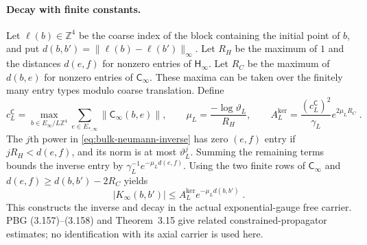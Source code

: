 \documentclass[11pt]{article}
\begin{document}
\paragraph{Decay with finite constants.}
Let $\ell(b)\in\mathbb Z^4$ be the coarse index of the block containing the initial point of $b$, and put $d(b,b')=\|\ell(b)-\ell(b')\|_\infty$. Let $R_H$ be the maximum of $1$ and the distances $d(e,f)$ for nonzero entries of $\mathsf H_\infty$. Let $R_C$ be the maximum of $d(b,e)$ for nonzero entries of $\mathsf C_\infty$. These maxima can be taken over the finitely many entry types modulo coarse translation. Define
\begin{equation}\label{eq:bulk-decay-constants}
    c_L^{\mathsf C}=\max_{b\in E_\infty/L\mathbb Z^4}
        \sum_{e\in E_{*,\infty}}\|\mathsf C_\infty(b,e)\|,
    \qquad
    \mu_L=\frac{-\log\vartheta_L}{R_H},
    \qquad
    A_L^{\mathrm{ker}}=\frac{(c_L^{\mathsf C})^2}{\gamma_L}e^{2\mu_LR_C}\;.
\end{equation}
The $j$th power in \eqref{eq:bulk-neumann-inverse} has zero $(e,f)$ entry if $jR_H<d(e,f)$, and its norm is at most $\vartheta_L^j$. Summing the remaining terms bounds the inverse entry by $\gamma_L^{-1}e^{-\mu_Ld(e,f)}$. Using the two finite rows of $\mathsf C_\infty$ and $d(e,f)\geq d(b,b')-2R_C$ yields
\begin{equation}\label{eq:bulk-kernel-decay}
    |K_\infty(b,b')|
        \leq A_L^{\mathrm{ker}}e^{-\mu_Ld(b,b')}\;.
\end{equation}
This constructs the inverse and decay in the actual exponential-gauge free carrier. PBG (3.157)--(3.158) and Theorem~3.15 give related constrained-propagator estimates; no identification with its axial carrier is used here.
\end{document}
